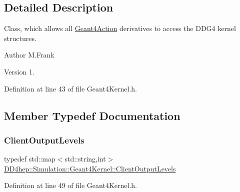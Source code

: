 \subsection{Detailed Description}
Class, which allows all \hyperlink{class_d_d4hep_1_1_simulation_1_1_geant4_action}{Geant4\+Action} derivatives to access the D\+D\+G4 kernel structures. 

\begin{DoxyAuthor}{Author}
M.\+Frank 
\end{DoxyAuthor}
\begin{DoxyVersion}{Version}
1. 
\end{DoxyVersion}


Definition at line 43 of file Geant4\+Kernel.\+h.



\subsection{Member Typedef Documentation}
\hypertarget{class_d_d4hep_1_1_simulation_1_1_geant4_kernel_a259066f5e9a56bdbfc9718a2b42b8b06}{}\label{class_d_d4hep_1_1_simulation_1_1_geant4_kernel_a259066f5e9a56bdbfc9718a2b42b8b06} 
\subsubsection{\texorpdfstring{Client\+Output\+Levels}{ClientOutputLevels}}
{\footnotesize\ttfamily typedef std\+::map$<$std\+::string,int$>$ \hyperlink{class_d_d4hep_1_1_simulation_1_1_geant4_kernel_a259066f5e9a56bdbfc9718a2b42b8b06}{D\+D4hep\+::\+Simulation\+::\+Geant4\+Kernel\+::\+Client\+Output\+Levels}}



Definition at line 49 of file Geant4\+Kernel.\+h.

\hypertarget{class_d_d4hep_1_1_simulation_1_1_geant4_kernel_a9cd070dfd06f049aa11b56688faaa643}{}\label{class_d_d4hep_1_1_simulation_1_1_geant4_kernel_a9cd070dfd06f049aa11b56688faaa643} 
